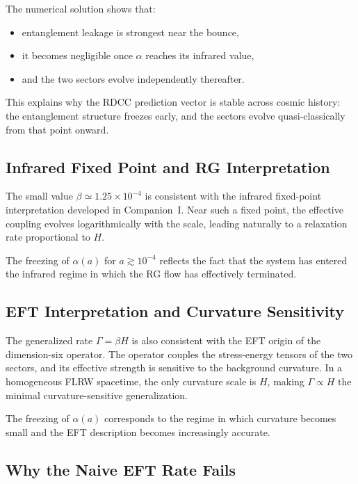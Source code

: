 \documentclass[11pt,a4paper]{article}
\begin{document}
The numerical solution shows that:
\begin{itemize}
    \item entanglement leakage is strongest near the bounce,
    \item it becomes negligible once $\alpha$ reaches its infrared value,
    \item and the two sectors evolve independently thereafter.
\end{itemize}

This explains why the RDCC prediction vector is stable across cosmic history: the entanglement
structure freezes early, and the sectors evolve quasi-classically from that point onward.

\subsection{Infrared Fixed Point and RG Interpretation}

The small value $\beta \simeq 1.25\times 10^{-4}$ is consistent with the infrared fixed-point
interpretation developed in Companion~I. Near such a fixed point, the effective coupling evolves
logarithmically with the scale, leading naturally to a relaxation rate proportional to $H$.

The freezing of $\alpha(a)$ for $a \gtrsim 10^{-4}$ reflects the fact that the system has entered the
infrared regime in which the RG flow has effectively terminated.

\subsection{EFT Interpretation and Curvature Sensitivity}

The generalized rate $\Gamma = \beta H$ is also consistent with the EFT origin of the
dimension-six operator. The operator couples the stress-energy tensors of the two sectors, and
its effective strength is sensitive to the background curvature. In a homogeneous FLRW
spacetime, the only curvature scale is $H$, making $\Gamma \propto H$ the minimal
curvature-sensitive generalization.

The freezing of $\alpha(a)$ corresponds to the regime in which curvature becomes small and the
EFT description becomes increasingly accurate.

\subsection{Why the Naive EFT Rate Fails}
\end{document}
